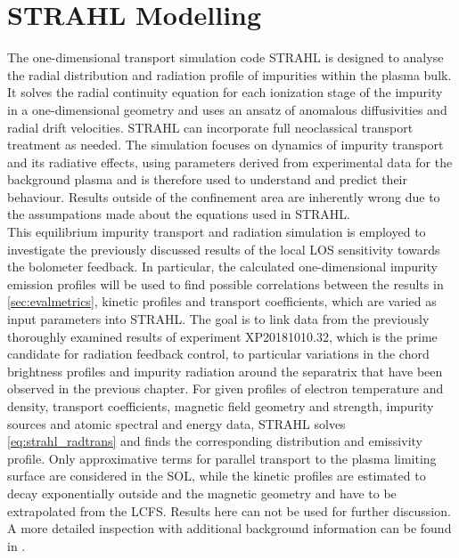     \section{STRAHL Modelling}\label{sec:strahlmodel}%
%
            The one-dimensional transport simulation code STRAHL is designed to analyse the radial distribution and radiation profile of impurities within the plasma bulk. It solves the radial continuity equation for each ionization stage of the impurity in a one-dimensional geometry and uses an ansatz of anomalous diffusivities and radial drift velocities. STRAHL can incorporate full neoclassical transport treatment as needed. The simulation focuses on dynamics of impurity transport and its radiative effects, using parameters derived from experimental data for the background plasma and is therefore used to understand and predict their behaviour. Results outside of the confinement area are inherently wrong due to the assumpations made about the equations used in STRAHL.\\%
            This equilibrium impurity transport and radiation simulation is employed to investigate the previously discussed results of the local LOS sensitivity towards the bolometer feedback. In particular, the calculated one-dimensional impurity emission profiles will be used to find possible correlations between the results in \cref{sec:evalmetrics}, kinetic profiles and transport coefficients, which are varied as input parameters into STRAHL. The goal is to link data from the previously thoroughly examined results of experiment XP20181010.32, which is the prime candidate for radiation feedback control, to particular variations in the chord brightness profiles and impurity radiation around the separatrix that have been observed in the previous chapter. For given profiles of electron temperature and density, transport coefficients, magnetic field geometry and strength, impurity sources and atomic spectral and energy data, STRAHL solves \cref{eq:strahl_radtrans} and finds the corresponding distribution and emissivity profile. Only approximative terms for parallel transport to the plasma limiting surface are considered in the SOL, while the kinetic profiles are estimated to decay exponentially outside and the magnetic geometry and have to be extrapolated from the LCFS. Results here can not be used for further discussion. A more detailed inspection with additional background information can be found in \cite{Dux2006,Goncharov2007,Behringer1987}.\\%
%
